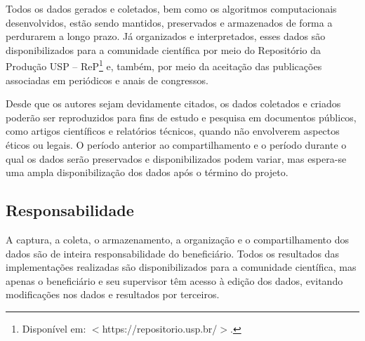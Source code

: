 Todos os dados gerados e coletados, bem como os algoritmos computacionais desenvolvidos, estão sendo mantidos, preservados e armazenados de forma a perdurarem a longo prazo. Já organizados e interpretados, esses dados são disponibilizados para a comunidade científica por meio do Repositório da Produção USP -- ReP\footnote{Disponível em: $<$https://repositorio.usp.br/$>$.} e, também, por meio da aceitação das publicações associadas em periódicos e anais de congressos.

Desde que os autores sejam devidamente citados, os dados coletados e criados poderão ser reproduzidos para fins de estudo e pesquisa em documentos públicos, como artigos científicos e relatórios técnicos, quando não envolverem aspectos éticos ou legais. O período anterior ao compartilhamento e o período durante o qual os dados serão preservados e disponibilizados podem variar, mas espera-se uma ampla disponibilização dos dados após o término do projeto.

\subsection{Responsabilidade}

A captura, a coleta, o armazenamento, a organização e o compartilhamento dos dados são de inteira responsabilidade do beneficiário. Todos os resultados das implementações realizadas são disponibilizados para a comunidade científica, mas apenas o beneficiário e seu supervisor têm acesso à edição dos dados, evitando modificações nos dados e resultados por terceiros.
